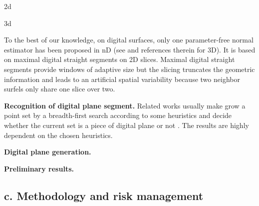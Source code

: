 2d \cite{Lachaud2007}

3d  

To the best of our knowledge, on digital surfaces, only one parameter-free normal estimator
has been proposed in nD (see \cite{Lachaud2003} and references therein for 3D).
It is based on maximal digital straight segments on 2D slices.
Maximal digital straight segments provide windows of adaptive size
but the slicing truncates the geometric information and leads to
an artificial spatial variability because two neighbor surfels only
share one slice over two.


\noindent\textbf{Recognition of digital plane segment.}
Related works usually make grow a point set by a breadth-first search according to some heuristics and decide whether the current set is a piece of digital plane or not \cite{Sivignon2004,Charrier2011}. The results are highly dependent on the chosen heuristics.   


\noindent\textbf{Digital plane generation.}


\noindent\textbf{Preliminary results.}

\subsection{c. Methodology and risk management}





